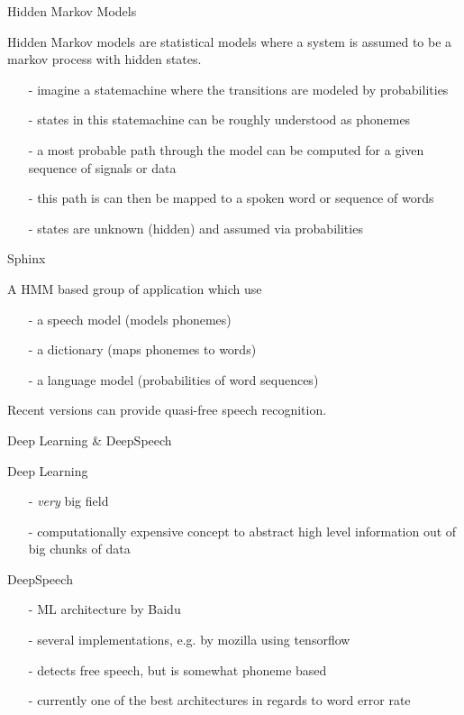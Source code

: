 \documentclass{beamer}
\begin{document}
	\begin{frame}{Hidden Markov Models}
		\begin{alertblock}{Hidden Markov models are statistical models where a system is assumed to be a markov process with hidden states.}
			\begin{itemize}
				\item[-] imagine a statemachine where the transitions are modeled by probabilities
				\item[-] states in this statemachine can be roughly understood as phonemes
				\item[-] a most probable path through the model can be computed for a given sequence of signals or data 
				\item[-] this path is can then be mapped to a spoken word or sequence of words
				\item[-] states are unknown (hidden) and assumed via probabilities
			\end{itemize}
		\end{alertblock}
	\end{frame}
	
	\begin{frame}{Sphinx}
		\begin{alertblock}{A HMM based group of application which use}
			\begin{itemize}
				\item[-] a speech model (models phonemes)
				\item[-] a dictionary (maps phonemes to words)
				\item[-] a language model (probabilities of word sequences)
			\end{itemize}
			
			Recent versions can provide quasi-free speech recognition.
		\end{alertblock}
	\end{frame}
	
	\begin{frame}{Deep Learning \& DeepSpeech}
		\begin{alertblock}{Deep Learning}
			\begin{itemize}
				\item[-] \emph{very} big field
				\item[-] computationally expensive concept to abstract high level information out of big chunks of data
			\end{itemize}
		\end{alertblock}
		\pause
		\begin{alertblock}{DeepSpeech}
			\begin{itemize}
				\item[-] ML architecture by Baidu
				\item[-] several implementations, e.g. by mozilla using tensorflow
				\item[-] detects free speech, but is somewhat phoneme based
				\item[-] currently one of the best architectures in regards to word error rate
			\end{itemize}
		\end{alertblock}
	\end{frame}
	
\end{document}
